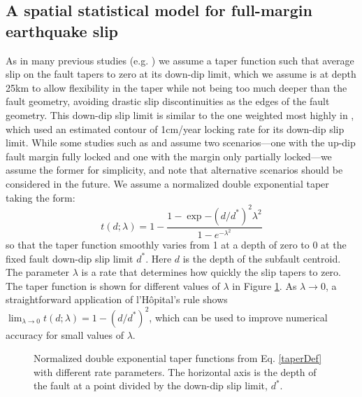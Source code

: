 {\subsection{A spatial statistical model for full-margin earthquake slip}
\label{model}
As in many previous studies (e.g. \citet{leonard2010, leveque2016, melgar2016}) we assume a taper function such that average slip on the fault tapers to zero at its down-dip limit, which we assume is at depth 25km to allow flexibility in the taper while not being too much deeper than the fault geometry, avoiding drastic slip discontinuities as the edges of the fault geometry.  This down-dip slip limit is similar to the one weighted most highly in \citet[p. 98-99]{hazardMaps2014}, which used an estimated contour of 1cm/year locking rate for its down-dip slip limit.  While some studies such as \citet{evans2015} and \citet{wang2013} assume two scenarios---one with the up-dip fault margin fully locked and one with the margin only partially locked---we assume the former for simplicity, and note that alternative scenarios should be considered in the future.  We assume a normalized double exponential taper taking the form:
\begin{equation}
t(d; \lambda) = 1 - \dfrac{1 - \exp{-(d/d^*)^2 \lambda^2}}{1 - e^{-\lambda^2}} \label{taperDef} 
\end{equation}
so that the taper function smoothly varies from 1 at a depth of zero to 0 at the fixed fault down-dip slip limit $d^*$.  Here $d$ is the depth of the subfault centroid.  The parameter $\lambda$ is a rate that determines how quickly the slip tapers to zero.  The taper function is shown for different values of $\lambda$ in Figure \ref{taper}.  As $\lambda \to 0$, a straightforward application of l'H\^{o}pital's rule shows $\lim_{\lambda \to 0} t(d; \lambda) = 1-(d/d^*)^2$, which can be used to improve numerical accuracy for small values of $\lambda$.

\begin{figure}
\centering
{}
\caption{Normalized double exponential taper functions from Eq. \ref{taperDef} with different rate parameters.  The horizontal axis is the depth of the fault at a point divided by the down-dip slip limit, $d^*$.}
\label{taper}
\end{figure}

}
